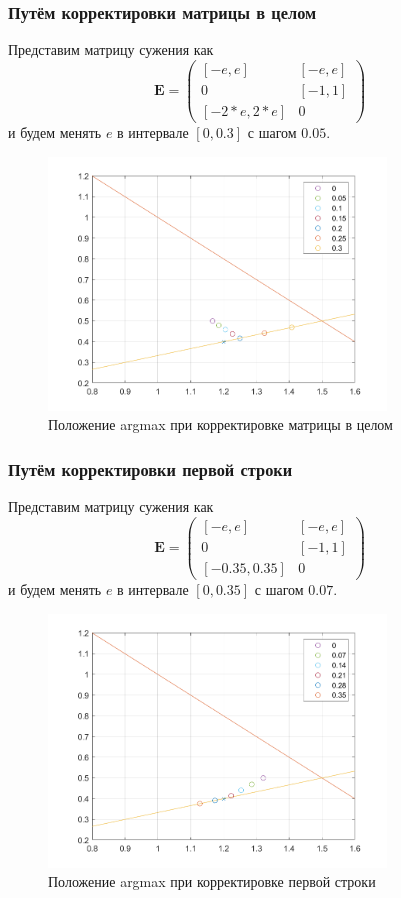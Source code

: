 \subsubsection{Путём корректировки матрицы в целом}
Представим матрицу сужения как
\begin{equation}
    \mathbf{E}=
    \begin{pmatrix}
[-e, e]  &  [-e, e] \\
0  &  [-1, 1] \\
[-2 * e, 2 * e]  &  0
\end{pmatrix}
\end{equation}
и будем менять $e$ в интервале $[0, 0.3]$ с шагом $0.05$.
\begin{figure}[H]
\centering
\includegraphics[width=0.8\textwidth]{Graphics/fullCorr.png}
\caption{Положение argmax при корректировке матрицы в целом} 
\end{figure}
\subsubsection{Путём корректировки первой строки}
Представим матрицу сужения как
\begin{equation}
    \mathbf{E}=
    \begin{pmatrix}
[-e, e]  &  [-e, e] \\
0  &  [-1, 1] \\
[-0.35, 0.35]  &  0
\end{pmatrix}
\end{equation}
и будем менять $e$ в интервале $[0, 0.35]$ с шагом $0.07$.
\begin{figure}[H]
\centering
\includegraphics[width=0.8\textwidth]{Graphics/row1Corr.png}
\caption{Положение argmax при корректировке первой строки} 
\end{figure}
